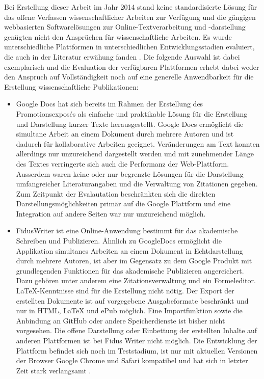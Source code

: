 Bei Erstellung dieser Arbeit im Jahr 2014 stand keine standardisierte Lösung für das offene Verfassen wissenschaftlicher Arbeiten zur Verfügung und die gängigen webbasierten Softwarelösungen zur Online-Textverarbeitung und -darstellung genügten nicht den Ansprüchen für wissenschaftliche Arbeiten. Es wurde unterschiedliche Plattformen in unterschiedlichen Entwicklungsstadien evaluiert, die auch in der Literatur erwähung fanden \cite{Perkel_2014}. Die folgende Auswahl ist dabei exemplarisch und die Evaluation der verfügbaren Plattformen erhebt dabei weder den Anspruch auf Vollständigkeit noch auf eine generelle Anwendbarkeit für die Erstellung wissenschaftliche Publikationen:
\begin{itemize}
\item Google Docs hat sich bereits im Rahmen der Erstellung des Promotionsexposés als einfache und praktikable Lösung für die Erstellung und Darstellung kurzer Texte herausgestellt. Google Docs ermöglicht die simultane Arbeit an einem Dokument durch mehrere Autoren und ist dadurch für kollaborative Arbeiten geeignet. Veränderungen am Text konnten allerdings nur unzureichend dargestellt werden und mit zunehmender Länge des Textes verringerte sich auch die Performanz der Web-Plattform. Ausserdem waren keine oder nur begrenzte Lösungen für die Darstellung umfangreicher Literaturangaben und die Verwaltung von Zitationen gegeben. Zum Zeitpunkt der Evalautation beschränkten sich die direkten Darstellungsmöglichkeiten primär auf die Google Plattform und eine Integration auf andere Seiten war nur unzureichend möglich.
\item FidusWriter ist eine Online-Anwendung bestimmt für das akademische Schreiben und Publizieren. Ähnlich zu GoogleDocs ermöglicht die Applikation simultanes Arbeiten an einem Dokument in Echtdarstellung durch mehrere Autoren, ist aber im Gegensatz zu dem Google Produkt mit grundlegenden Funktionen für das akademische Publizieren angereichert. Dazu gehören unter anderem eine Zitationsverwaltung und ein Formeleditor. LaTeX-Kenntnisse sind für die Erstellung nicht nötig. Der Export der erstellten Dokumente ist auf vorgegebene Ausgabeformate beschränkt und nur in HTML, LaTeX und ePub möglich. Eine Importfunktion sowie die Anbindung an GitHub oder andere Speicherdienste ist bisher nicht vorgesehen. Die offene Darstellung oder Einbettung der erstellten Inhalte auf anderen Plattformen ist bei Fidus Writer nicht möglich. Die Entwicklung der Plattform befindet sich noch im Teststadium, ist nur mit aktuellen Versionen der Browser Google Chrome und Safari kompatibel und hat sich in letzter Zeit stark verlangsamt \cite{fidus_2015}.

\end{itemize}
